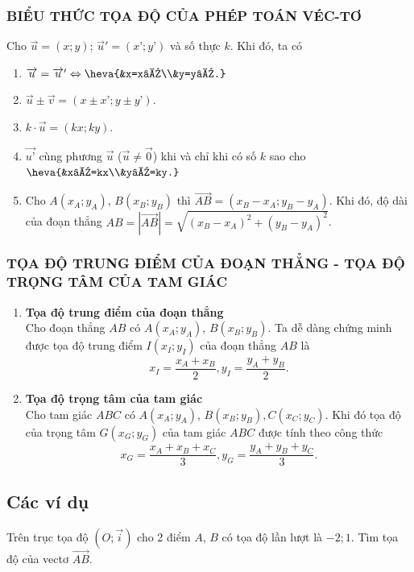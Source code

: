 \begin{tomtat}
\subsubsection{BIỂU THỨC TỌA ĐỘ CỦA PHÉP TOÁN VÉC-TƠ}
	\begin{dl}
		Cho $\overrightarrow{u}=(x;y)$; $\overrightarrow{u}'=(x’;y’)$ và số thực $k$. Khi đó, ta có
		\begin{enumerate}
			\item  $\overrightarrow{u}=\overrightarrow{u}'\Leftrightarrow\heva{&x=x’\\&y=y’.}$ 
			\item  $\overrightarrow{u}\pm\overrightarrow{v}=(x\pm x’;y\pm y’)$.
			\item  $k\cdot\overrightarrow{u}=(kx;ky)$.
			\item  $\overrightarrow{u’}$ cùng phương $\overrightarrow{u}$ ($\overrightarrow{u}\neq\overrightarrow{0}$) khi và chỉ khi có số $k$ sao cho $\heva{&x’=kx\\&y’=ky.}$ 
			\item  Cho $A(x_A;y_A)$, $B(x_B;y_B)$ thì $\overrightarrow{AB}=\left(x_B-x_A;y_B-y_A\right)$. Khi đó, độ dài của đoạn thẳng $AB=\left|\overrightarrow{AB}\right|=\sqrt{\left(x_B-x_A\right)^2+\left(y_B-y_A\right)^2}$.
		\end{enumerate}		
	\end{dl}
\subsubsection{TỌA ĐỘ TRUNG ĐIỂM CỦA ĐOẠN THẲNG - TỌA ĐỘ TRỌNG TÂM CỦA TAM GIÁC}
\begin{enumerate}	
\item \textbf{Tọa độ trung điểm của đoạn thẳng}\\
Cho đoạn thẳng $AB$ có $A(x_A;y_A)$, $B(x_B;y_B)$. Ta dễ dàng chứng minh được tọa độ trung điểm $I(x_I;y_I)$ của đoạn thẳng $AB$ là $$x_I=\dfrac{x_A+x_B}{2}, y_I=\dfrac{y_A+y_B}{2}.$$
\item \textbf{Tọa độ trọng tâm của tam giác}\\
Cho tam giác $ABC$ có $A(x_A;y_A)$, $B(x_B;y_B), C(x_C;y_C)$. Khi đó tọa độ của trọng tâm $G(x_G;y_G)$ của tam giác $ABC$ được tính theo công thức $$x_G=\dfrac{x_A+x_B+x_C}{3}, y_G=\dfrac{y_A+y_B+y_C}{3}.$$
\end{enumerate}	
\end{tomtat}
\subsection{Các ví dụ}
\begin{vd}%
	Trên trục tọa độ $\left(O;\overrightarrow{i}\right)$ cho 2 điểm $A$, $B$ có tọa độ lần lượt là $-2; 1$. Tìm tọa độ của vectơ $\overrightarrow{AB}$.
\end{vd}

